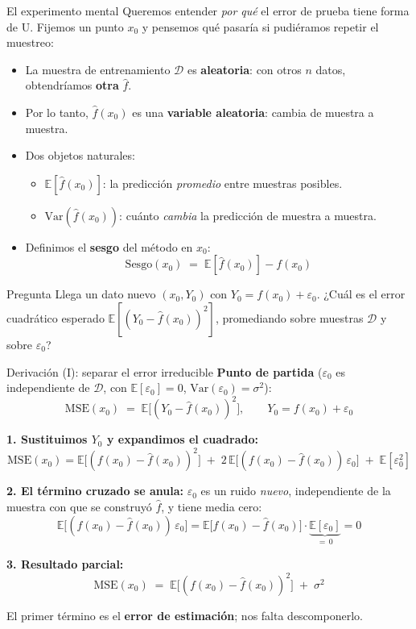 \documentclass{beamer}
\newcommand{\E}{\mathbb{E}}
\newcommand{\Var}{\mathrm{Var}}
\newcommand{\1}{\mathbb{I}}
\newcommand{\MSE}{\mathrm{MSE}}
\begin{document}
\begin{frame}{El experimento mental}
\small
Queremos entender \emph{por qué} el error de prueba tiene forma de U. Fijemos un punto $x_0$ y pensemos qué pasaría si pudiéramos repetir el muestreo:
\pause
\begin{itemize}\itemsep5pt
  \item La muestra de entrenamiento $\mathcal{D}$ es \textbf{aleatoria}: con otros $n$ datos, obtendríamos \textbf{otra} $\hat{f}$.
  \item Por lo tanto, $\hat{f}(x_0)$ es una \textbf{variable aleatoria}: cambia de muestra a muestra. \pause
  \item Dos objetos naturales:
  \begin{itemize}\itemsep3pt
    \item $\E[\hat{f}(x_0)]$: la predicción \emph{promedio} entre muestras posibles.
    \item $\Var(\hat{f}(x_0))$: cuánto \emph{cambia} la predicción de muestra a muestra.
  \end{itemize} \pause
  \item Definimos el \textbf{sesgo} del método en $x_0$:
  \[ \mathrm{Sesgo}(x_0) \;=\; \E[\hat{f}(x_0)] - f(x_0) \]
\end{itemize}
\pause
\begin{block}{Pregunta}
Llega un dato nuevo $(x_0, Y_0)$ con $Y_0 = f(x_0) + \varepsilon_0$. ¿Cuál es el error cuadrático esperado $\E[(Y_0 - \hat{f}(x_0))^2]$, promediando sobre muestras $\mathcal{D}$ y sobre $\varepsilon_0$?
\end{block}
\end{frame}

\begin{frame}{Derivación (I): separar el error irreducible}
\small
\textbf{Punto de partida} ($\varepsilon_0$ es independiente de $\mathcal{D}$, con $\E[\varepsilon_0] = 0$, $\Var(\varepsilon_0) = \sigma^2$):
\[ \MSE(x_0) \;=\; \E\big[(Y_0 - \hat{f}(x_0))^2\big], \qquad Y_0 = f(x_0) + \varepsilon_0 \]
\pause

\textbf{1. Sustituimos $Y_0$ y expandimos el cuadrado:}
\[ \MSE(x_0) = \E\big[(f(x_0) - \hat{f}(x_0))^2\big] \;+\; 2\,\E\big[(f(x_0) - \hat{f}(x_0))\,\varepsilon_0\big] \;+\; \E[\varepsilon_0^2] \]
\pause

\textbf{2. El término cruzado se anula:} $\varepsilon_0$ es un ruido \emph{nuevo}, independiente de la muestra con que se construyó $\hat{f}$, y tiene media cero:
\[ \E\big[(f(x_0) - \hat{f}(x_0))\,\varepsilon_0\big] = \E\big[f(x_0) - \hat{f}(x_0)\big] \cdot \underbrace{\E[\varepsilon_0]}_{=\,0} = 0 \]
\pause

\textbf{3. Resultado parcial:}
\[ \MSE(x_0) \;=\; \E\big[(f(x_0) - \hat{f}(x_0))^2\big] \;+\; \sigma^2 \]

El primer término es el \textbf{error de estimación}; nos falta descomponerlo.
\end{frame}
\end{document}
